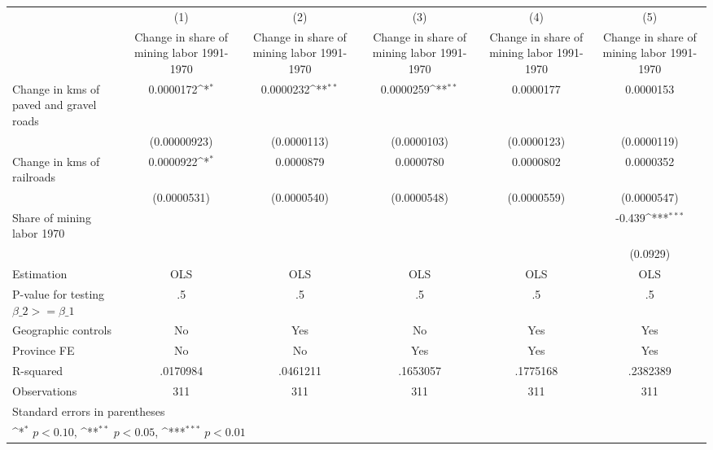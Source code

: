 {
\def\sym#1{\ifmmode^{#1}\else\(^{#1}\)\fi}
\begin{tabular}{l*{5}{c}}
\hline\hline
                    &\multicolumn{1}{c}{(1)}&\multicolumn{1}{c}{(2)}&\multicolumn{1}{c}{(3)}&\multicolumn{1}{c}{(4)}&\multicolumn{1}{c}{(5)}\\
                    &\multicolumn{1}{c}{Change in share of mining labor 1991-1970}&\multicolumn{1}{c}{Change in share of mining labor 1991-1970}&\multicolumn{1}{c}{Change in share of mining labor 1991-1970}&\multicolumn{1}{c}{Change in share of mining labor 1991-1970}&\multicolumn{1}{c}{Change in share of mining labor 1991-1970}\\
\hline
Change in kms of paved and gravel roads&   0.0000172\sym{*}  &   0.0000232\sym{**} &   0.0000259\sym{**} &   0.0000177         &   0.0000153         \\
                    &(0.00000923)         & (0.0000113)         & (0.0000103)         & (0.0000123)         & (0.0000119)         \\
[1em]
Change in kms of railroads&   0.0000922\sym{*}  &   0.0000879         &   0.0000780         &   0.0000802         &   0.0000352         \\
                    & (0.0000531)         & (0.0000540)         & (0.0000548)         & (0.0000559)         & (0.0000547)         \\
[1em]
Share of mining labor 1970&                     &                     &                     &                     &      -0.439\sym{***}\\
                    &                     &                     &                     &                     &    (0.0929)         \\
\hline
Estimation          &         OLS         &         OLS         &         OLS         &         OLS         &         OLS         \\
P-value for testing $\beta\_2 >= \beta\_1$&          .5         &          .5         &          .5         &          .5         &          .5         \\
Geographic controls &          No         &         Yes         &          No         &         Yes         &         Yes         \\
Province FE         &          No         &          No         &         Yes         &         Yes         &         Yes         \\
R-squared           &    .0170984         &    .0461211         &    .1653057         &    .1775168         &    .2382389         \\
Observations        &         311         &         311         &         311         &         311         &         311         \\
\hline\hline
\multicolumn{6}{l}{\footnotesize Standard errors in parentheses}\\
\multicolumn{6}{l}{\footnotesize \sym{*} \(p<0.10\), \sym{**} \(p<0.05\), \sym{***} \(p<0.01\)}\\
\end{tabular}
}
